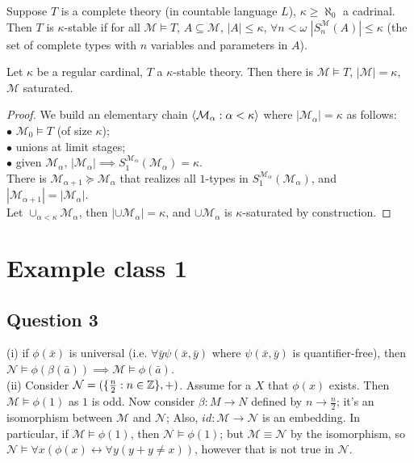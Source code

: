 \documentclass[a4paper]{article}
\begin{document}
\begin{defi}
    Suppose $T$ is a complete theory (in countable language $L$), $\kappa \geq \aleph_0$ a cadrinal. Then $T$ is $\kappa$-stable if for all $\mathcal{M} \vDash T$, $A \subseteq \mathcal{M}$, $|A| \leq \kappa$, $\forall n < \omega$ $|S_n^\mathcal{M}(A)| \leq \kappa$ (the set of complete types with $n$ variables and parameters in $A$).
\end{defi}

\begin{thm}
    Let $\kappa$ be a regular cardinal, $T$ a $\kappa$-stable theory. Then there is $\mathcal{M} \vDash T$, $|\mathcal{M}| = \kappa$, $\mathcal{M}$ saturated.
    \begin{proof}
        We build an elementary chain $\langle \mathcal{M}_\alpha: \alpha < \kappa \rangle$ where $|\mathcal{M}_\alpha| = \kappa$ as follows:\\
        $\bullet$ $\mathcal{M}_0 \vDash T$ (of size $\kappa$);\\
        $\bullet$ unions at limit stages;\\
        $\bullet$ given $\mathcal{M}_\alpha$, $|\mathcal{M}_\alpha| \implies S_1^{\mathcal{M}_\alpha}(\mathcal{M}_\alpha) = \kappa$.\\
        There is $\mathcal{M}_{\alpha+1} \succcurlyeq \mathcal{M}_\alpha$ that realizes all $1$-types in $S_1^{\mathcal{M}_\alpha}(\mathcal{M}_\alpha)$, and $|\mathcal{M}_{\alpha+1}| = |\mathcal{M}_\alpha|$.\\
        Let $\cup_{\alpha<\kappa} \mathcal{M}_\alpha$, then $|\cup \mathcal{M}_\alpha| = \kappa$, and $\cup \mathcal{M}_\alpha$ is $\kappa$-saturated by construction.
    \end{proof}
\end{thm}


\newpage

\section{Example class 1}

\subsection{Question 3}
(i) if $\phi(\bar{x})$ is universal (i.e. $\forall \bar{y} \psi(\bar{x},\bar{y})$ where $\psi(\bar{x},\bar{y})$ is quantifier-free), then $\mathcal{N} \vDash \phi(\beta(\bar{a})) \implies \mathcal{M} \vDash \phi(\bar{a})$.\\
(ii) Consider $\mathcal{N} = (\{\frac{n}{2} : n \in \mathbb{Z} \},+)$. Assume for a $X$ that $\phi(x)$ exists. Then $\mathcal{M} \vDash \phi(1)$ as $1$ is odd. Now consider $\beta:M \to N$ defined by $n \to \frac{n}{2}$; it's an isomorphism between $\mathcal{M}$ and $\mathcal{N}$; Also, $id:\mathcal{M} \to \mathcal{N}$ is an embedding. In particular, if $\mathcal{M} \vDash \phi(1)$, then $\mathcal{N} \vDash \phi(1)$; but $\mathcal{M} \equiv \mathcal{N}$ by the isomorphism, so $\mathcal{N} \vDash \forall x (\phi(x) \leftrightarrow \forall y (y +y \neq x))$, however that is not true in $\mathcal{N}$.
\end{document}
